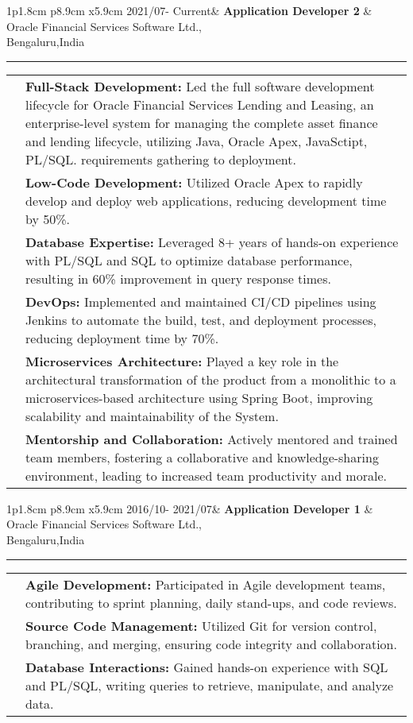 \documentclass[10pt,A4]{article}
\newcommand{\tzlarrow}{(0,0) -- (0.2,0) -- (0.3,0.2) -- (0.2,0.4) -- (0,0.4) -- (0.1,0.2) -- cycle;}
\newcommand{\larrow}[1]
{\begin{tikzpicture}[scale=0.58]
	 \filldraw[fill=#1!100,draw=#1!100!black]  \tzlarrow
 \end{tikzpicture}
}
\newcommand{\cvexptwo}[5]
{
\vspace{4pt}
	\begin{tabular*}{1\textwidth}{p{1.8cm}  p{8.5cm} x{6.2cm}}
 \textcolor{bgcol}{#1}& \textbf{#2} & \vspace{2.5pt}\textcolor{sectcol}{#3}

	\end{tabular*}
\vspace{-12pt}
\textcolor{softcol}{\hrule}
\vspace{6pt}
	\begin{tabular*}{1\textwidth}{p{1.8cm} p{14.4cm}}
&		 \larrow{bgcol}  #4\\[3pt]
&		 \larrow{bgcol}  #5\\[6pt]
	\end{tabular*}

}
\newcommand{\cvexpthree}[6]
{
\vspace{4pt}
    \begin{tabular*}{1\textwidth}{p{1.8cm}  p{8.9cm} x{5.9cm}}
 \textcolor{bgcol}{#1}& \textbf{#2} & \vspace{2.5pt}\textcolor{sectcol}{#3}

	\end{tabular*}
\vspace{-12pt}
\textcolor{softcol}{\hrule}
\vspace{6pt}
	\begin{tabular*}{1\textwidth}{p{1.8cm} p{14.4cm}}
&		 \larrow{bgcol}  #4\\[3pt]
&		 \larrow{bgcol}  #5\\[6pt]
&		 \larrow{bgcol}  #6\\[6pt]
	\end{tabular*}
}
\newcommand{\cvexpsix}[9]
{
\vspace{4pt}
    \begin{tabular*}{1\textwidth}{p{1.8cm}  p{8.9cm} x{5.9cm}}
 \textcolor{bgcol}{#1}& \textbf{#2} & \vspace{2.5pt}\textcolor{sectcol}{#3}

	\end{tabular*}
\vspace{-12pt}
\textcolor{softcol}{\hrule}
\vspace{6pt}
	\begin{tabular*}{1\textwidth}{p{1.8cm} p{14.4cm}}
&		 \larrow{bgcol}  #4\\[6pt]
&		 \larrow{bgcol}  #5\\[6pt]
&		 \larrow{bgcol}  #6\\[6pt]
&		 \larrow{bgcol}  #7\\[6pt]
&		 \larrow{bgcol}  #8\\[6pt]
&		 \larrow{bgcol}  #9\\[6pt]
	\end{tabular*}
}
\begin{document}
\cvexpsix{\small{2021/07- Current}}
{\small{Application Developer 2}}
{\small{Oracle Financial Services Software Ltd.,\\ Bengaluru,India}}
{\small{\textbf{Full-Stack Development:} Led the full software development lifecycle for Oracle Financial Services Lending and Leasing, an enterprise-level system for managing the complete asset finance and lending lifecycle, utilizing Java, Oracle Apex, JavaSctipt, PL/SQL. requirements gathering to deployment.}}
{\small{\textbf{Low-Code Development:} Utilized Oracle Apex to rapidly develop and deploy web
applications, reducing development time by 50\%.}}
{\small{\textbf{Database Expertise:} Leveraged 8+ years of hands-on experience with PL/SQL and
SQL to optimize database performance, resulting in 60\% improvement
in query response times.}}
{\small {\textbf{DevOps:} Implemented and maintained CI/CD pipelines using Jenkins to automate
the build, test, and deployment processes, reducing deployment time by
70\%.}}
{\small {\textbf{Microservices Architecture:} Played a key role in the architectural transformation of
the product from a monolithic to a microservices-based architecture using Spring
Boot, improving scalability and maintainability of the System.}}
{\small {\textbf{Mentorship and Collaboration:} Actively mentored and trained team members,
fostering a collaborative and knowledge-sharing environment, leading to increased
team productivity and morale.}}

\cvexpthree{\small{2016/10- 2021/07}}
{\small{Application Developer 1}}
{\small{Oracle Financial Services Software Ltd.,\\ Bengaluru,India}}
{\small{\textbf{Agile Development:} Participated in Agile development teams, contributing to
sprint planning, daily stand-ups, and code reviews.}}
{\small{\textbf{Source Code Management:} Utilized Git for version control, branching, and merging,
ensuring code integrity and collaboration.}}
{\small{\textbf{Database Interactions:} Gained hands-on experience with SQL and PL/SQL, writing
queries to retrieve, manipulate, and analyze data.}}



\end{document}
